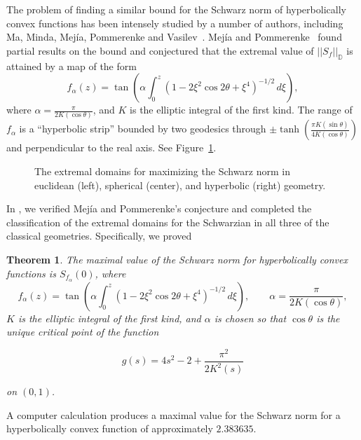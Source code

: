 \documentclass[12pt]{icgft}
\newcommand{\D}{\mathbb D}
\newcommand{\norm}[1]{\lvert\lvert#1\rvert\rvert}
\newtheorem{theorem}{Theorem}[section]
\newtheorem{thm}{Assertion}
\theoremstyle{definition}
\numberwithin{equation}{section}
\begin{document}
The problem of finding a similar bound for the Schwarz norm of hyperbolically
convex functions has been intensely studied by a number of authors, including
Ma,  Minda,  Mej\'ia,  Pommerenke and  Vasilev~\cite
{MM94,MM99,MP00,MPV01,MP02,PM00}.  Mej\'ia and Pommerenke~\cite{PM00}
found partial results on the bound and conjectured that the
extremal value of $\norm{S_f}_\D$ is attained by a map of the form
\begin{equation}  \label{E:tanh}
f_\alpha (z)=\tan\left( \alpha\int_0^z \left(1-2\xi^2\cos 2\theta+\xi^4
\right)^{-1/2}\,d\xi \right),
\end{equation}
where $\alpha = \frac{\pi}{2K(\cos \theta)}$,
and $K$ is the elliptic integral of the first kind.
The range of $f_\alpha$ is a ``hyperbolic strip''
bounded by two geodesics through $\pm \tanh
\left(\frac{\pi K(\sin\theta)}{4K(\cos\theta)}\right)$ and perpendicular
to the real axis.
See Figure~\ref{F:convex3}.


\begin{figure}
\begin{center}
\caption{The extremal domains for maximizing the Schwarz norm in euclidean (left), spherical (center), and hyperbolic (right) geometry.}
\label{F:convex3}
\end{center}
\end{figure}


In \cite{BCPW}, we verified Mej\'ia and Pommerenke's conjecture and  completed
the classification of the extremal domains for the Schwarzian in all
three of the classical geometries.  Specifically, we proved


\begin{theorem}
The maximal value of the Schwarz norm for hyperbolically convex
functions is $S_{f_\alpha}(0)$, where
\[
f_\alpha(z) =\tan\left( \alpha\int_0^z \left(1-2\xi^2\cos 2\theta+\xi^4
\right)^{-1/2}\,d\xi \right),  \qquad \alpha  = \frac{\pi}{2K(\cos \theta)},
\]
$K$ is the elliptic integral of the first kind, and $\alpha$ is chosen
so that $\cos \theta$ is the unique critical point of the function

\begin{equation} \label{e:gs}
g(s) = 4s^2-2 +\frac{\pi^2}{2K^2({s})}
\end{equation}

on $(0,1)$.
\end{theorem}

A computer calculation produces a  maximal value for the
Schwarz norm for a hyperbolically convex
function of approximately $2.383635$.
\end{document}
